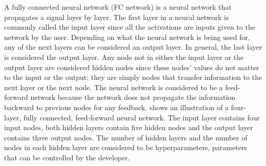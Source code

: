 A fully connected neural network (FC network) is a neural network that propagates a signal layer by layer. The first layer in a neural network is commonly called the input layer since all the activations are inputs given to the network by the user. Depending on what the neural network is being used for, any of the next layers can be considered an output layer. In general, the last layer is considered the output layer. Any node not in either the input layer or the output layer are considered hidden nodes since these nodes' values do not matter to the input or the output; they are simply nodes that transfer information to the next layer or the next node. The neural network is considered to be a feed-forward network because the network does not propagate the information backward to previous nodes for any feedback.  shows an illustration of a four-layer, fully connected, feed-forward neural network. The input layer contains four input nodes, both hidden layers contain five hidden nodes and the output layer contains three output nodes. The number of hidden layers and the number of nodes in each hidden layer are considered to be hyperparameters, parameters that can be controlled by the developer.

